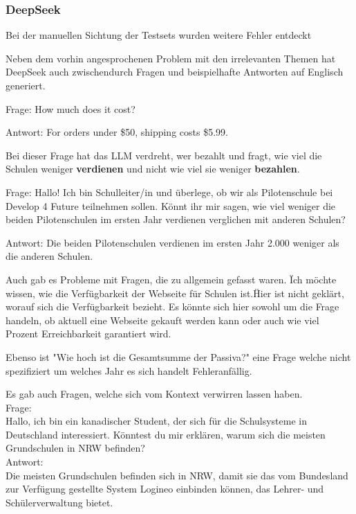 \subsubsection{DeepSeek}

Bei der manuellen Sichtung der Testsets wurden weitere Fehler entdeckt

Neben dem vorhin angesprochenen Problem mit den irrelevanten Themen hat DeepSeek auch zwischendurch Fragen und beispielhafte Antworten auf Englisch generiert.

Frage:
How much does it cost?

Antwort:
For orders under \$50, shipping costs \$5.99.

Bei dieser Frage hat das LLM verdreht, wer bezahlt und fragt, wie viel die Schulen weniger \textbf{verdienen} und nicht wie viel sie weniger \textbf{bezahlen}.

Frage:
Hallo! Ich bin Schulleiter/in und überlege, ob wir als Pilotenschule bei Develop 4 Future teilnehmen sollen. Könnt ihr mir sagen, wie viel weniger die beiden Pilotenschulen im ersten Jahr verdienen verglichen mit anderen Schulen?

Antwort:
Die beiden Pilotenschulen verdienen im ersten Jahr 2.000 \texteuro weniger als die anderen Schulen.

Auch gab es Probleme mit Fragen, die zu allgemein gefasst waren. \"Ich möchte wissen, wie die Verfügbarkeit der Webseite für Schulen ist.\"
Hier ist nicht geklärt, worauf sich die Verfügbarkeit bezieht. Es könnte sich hier sowohl um die Frage handeln, ob aktuell eine Webseite gekauft werden kann oder auch wie viel Prozent Erreichbarkeit garantiert wird.

Ebenso ist "Wie hoch ist die Gesamtsumme der Passiva?" eine Frage welche nicht spezifiziert um welches Jahr es sich handelt Fehleranfällig.

Es gab auch Fragen, welche sich vom Kontext verwirren lassen haben.\\
Frage:\\
Hallo, ich bin ein kanadischer Student, der sich für die Schulsysteme in Deutschland interessiert. Könntest du mir erklären, warum sich die meisten Grundschulen in NRW befinden?\\
Antwort:\\
Die meisten Grundschulen befinden sich in NRW, damit sie das vom Bundesland zur Verfügung gestellte System Logineo einbinden können, das Lehrer- und Schülerverwaltung bietet.

